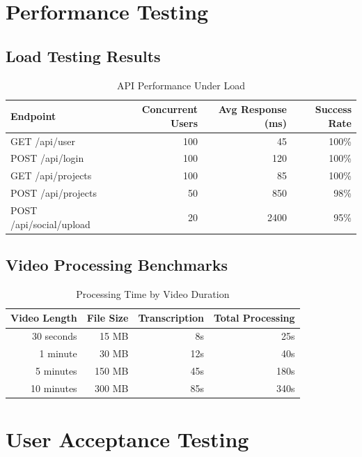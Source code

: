 \section{Performance Testing}

\subsection{Load Testing Results}

\begin{table}[H]
\centering
\caption{API Performance Under Load}
\begin{tabular}{@{}lrrr@{}}
\toprule
\textbf{Endpoint} & \textbf{Concurrent Users} & \textbf{Avg Response (ms)} & \textbf{Success Rate} \\
\midrule
GET /api/user & 100 & 45 & 100\% \\
POST /api/login & 100 & 120 & 100\% \\
GET /api/projects & 100 & 85 & 100\% \\
POST /api/projects & 50 & 850 & 98\% \\
POST /api/social/upload & 20 & 2400 & 95\% \\
\bottomrule
\end{tabular}
\end{table}

\subsection{Video Processing Benchmarks}

\begin{table}[H]
\centering
\caption{Processing Time by Video Duration}
\begin{tabular}{@{}rrrr@{}}
\toprule
\textbf{Video Length} & \textbf{File Size} & \textbf{Transcription} & \textbf{Total Processing} \\
\midrule
30 seconds & 15 MB & 8s & 25s \\
1 minute & 30 MB & 12s & 40s \\
5 minutes & 150 MB & 45s & 180s \\
10 minutes & 300 MB & 85s & 340s \\
\bottomrule
\end{tabular}
\end{table}

\section{User Acceptance Testing}


